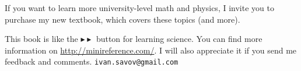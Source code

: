 \documentclass[letterpaper,9pt,journal]{IEEEtran}
\begin{document}
If you want to learn more university-level math and physics, 
I invite you to purchase my new textbook, which covers these topics (and more).
        \begin{center}
            \setlength{\fboxsep}{0.45cm}
            \fbox{
            \begin{minipage}{55mm}   
\vspace{15mm}
\section*{\Large NO BULLSHIT \\ guide to \\ MATH and PHYSICS  } %
\vspace{17mm}
\ Contents:
\begin{itemize}
  \item {\sc high school math}%
  \item {\sc vectors}%
  \item {\sc mechanics}%
  \item {\sc differential calculus}%
  \item {\sc integral calculus}%
\end{itemize}
\vspace{8mm}

{\small \hfill  5\textonehalf[in] $\times$ 8\textonehalf[in] $\times$ 297[pages]}

\end{minipage}
            }
        \end{center}
This book is like the $\blacktriangleright\!\blacktriangleright$ button for learning science.        
You can find more information on \url{http://minireference.com/}.
I will also appreciate it if you send me feedback and comments. \hfill \texttt{ivan.savov@gmail.com}


%


    
\end{document}
